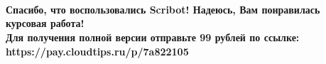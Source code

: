 ~\\
~\\
~\\
\begin{center}
    \topskip=0pt
    \vspace*{\fill}
    \textbf{
Спасибо, что воспользовались Scribot! Надеюсь, Вам понравилась курсовая работа!\\
Для получения полной версии отправьте 99 рублей по ссылке:\\
https://pay.cloudtips.ru/p/7a822105\\
}
\end{center}
\newpage
\tableofcontents
\newpage